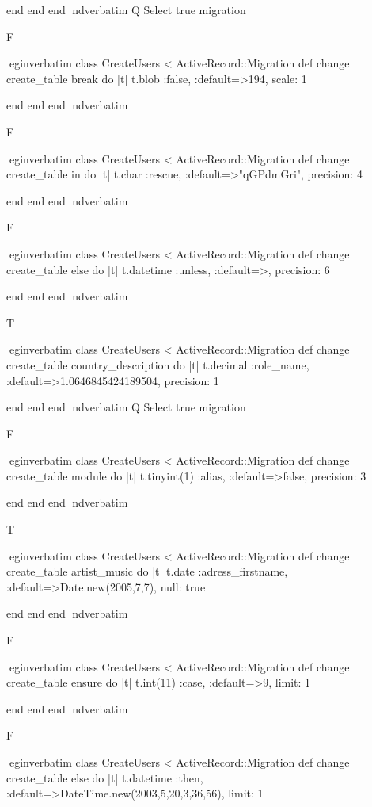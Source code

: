     end 
  end 
end
nd{verbatim}
Q
 Select true migration

F

egin{verbatim}
 class CreateUsers < ActiveRecord::Migration 
  def change 
    create_table break do |t| 
      t.blob :false, :default=>194, scale: 1
    
    end 
  end 
end
nd{verbatim}

F

egin{verbatim}
 class CreateUsers < ActiveRecord::Migration 
  def change 
    create_table in do |t| 
      t.char :rescue, :default=>"qGPdmGri", precision: 4
    
    end 
  end 
end
nd{verbatim}

F

egin{verbatim}
 class CreateUsers < ActiveRecord::Migration 
  def change 
    create_table else do |t| 
      t.datetime :unless, :default=>, precision: 6
    
    end 
  end 
end
nd{verbatim}

T

egin{verbatim}
 class CreateUsers < ActiveRecord::Migration 
  def change 
    create_table country_description do |t| 
      t.decimal :role_name, :default=>1.0646845424189504, precision: 1
    
    end 
  end 
end
nd{verbatim}
Q
 Select true migration

F

egin{verbatim}
 class CreateUsers < ActiveRecord::Migration 
  def change 
    create_table module do |t| 
      t.tinyint(1) :alias, :default=>false, precision: 3
    
    end 
  end 
end
nd{verbatim}

T

egin{verbatim}
 class CreateUsers < ActiveRecord::Migration 
  def change 
    create_table artist_music do |t| 
      t.date :adress_firstname, :default=>Date.new(2005,7,7), null: true
    
    end 
  end 
end
nd{verbatim}

F

egin{verbatim}
 class CreateUsers < ActiveRecord::Migration 
  def change 
    create_table ensure do |t| 
      t.int(11) :case, :default=>9, limit: 1
    
    end 
  end 
end
nd{verbatim}

F

egin{verbatim}
 class CreateUsers < ActiveRecord::Migration 
  def change 
    create_table else do |t| 
      t.datetime :then, :default=>DateTime.new(2003,5,20,3,36,56), limit: 1
    
